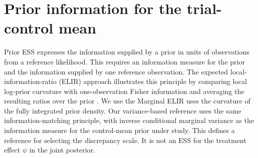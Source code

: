 \documentclass[11pt]{article}
\theoremstyle{remark}\newtheorem{remark}{Remark}[section]
\providecommand{\DIFaddtex}[1]{{\protect\color{blue} \sf #1}} %
\providecommand{\DIFdeltex}[1]{{\protect\color{red} \scriptsize #1}} %
\providecommand{\DIFaddbegin}{} %
\providecommand{\DIFaddend}{} %
\providecommand{\DIFdelbegin}{} %
\providecommand{\DIFdelend}{} %
\providecommand{\DIFadd}[1]{\texorpdfstring{\DIFaddtex{#1}}{#1}} %
\providecommand{\DIFdel}[1]{\texorpdfstring{\DIFdeltex{#1}}{}} %
\begin{document}
\section{\DIFadd{Prior information for the trial-control mean}}\label{sec:ess}
\DIFaddend Prior ESS expresses the information supplied by a prior in units of observations from a reference likelihood. This requires an information measure for the prior and the information supplied by one reference observation. The expected local-information-ratio (ELIR) approach illustrates this principle by comparing local log-prior curvature with one-observation Fisher information and averaging the resulting ratios over the prior \citep{neuenschwander2020}. \DIFdelbegin \DIFdel{We use the }\DIFdelend \DIFaddbegin \DIFadd{Marginal ELIR uses the curvature of the fully integrated prior density. Our variance-based reference uses the }\DIFaddend same information-matching principle, with inverse conditional marginal variance as the information measure for the \DIFaddbegin \DIFadd{control-mean }\DIFaddend prior under study. \DIFaddbegin \DIFadd{This defines a reference for selecting the discrepancy scale. It is not an ESS for the treatment effect $\psi$ in the joint posterior.
}\DIFaddend 
\end{document}
